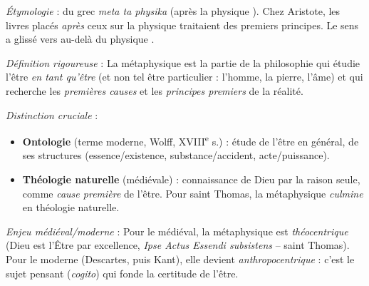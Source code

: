 \documentclass[11pt]{article}
\begin{document}
\begin{definition}
\emph{Étymologie} : du grec \emph{meta ta physika} (\guillemotleft après la physique \guillemotright). Chez Aristote, les livres placés \emph{après} ceux sur la physique traitaient des premiers principes. Le sens a glissé vers \guillemotleft au-delà du physique \guillemotright.
\par
\emph{Définition rigoureuse} : La métaphysique est la partie de la philosophie qui étudie l'être \emph{en tant qu'être} (et non tel être particulier : l'homme, la pierre, l'âme) et qui recherche les \emph{premières causes} et les \emph{principes premiers} de la réalité.
\par
\emph{Distinction cruciale} :
\begin{itemize}
    \item \textbf{Ontologie} (terme moderne, Wolff, XVIII\textsuperscript{e} s.) : étude de l'être en général, de ses structures (essence/existence, substance/accident, acte/puissance).
    \item \textbf{Théologie naturelle} (médiévale) : connaissance de Dieu par la raison seule, comme \emph{cause première} de l'être. Pour saint Thomas, la métaphysique \emph{culmine} en théologie naturelle.
\end{itemize}
\par
\emph{Enjeu médiéval/moderne} : Pour le médiéval, la métaphysique est \emph{théocentrique} (Dieu est l'Être par excellence, \emph{Ipse Actus Essendi subsistens} -- saint Thomas). Pour le moderne (Descartes, puis Kant), elle devient \emph{anthropocentrique} : c'est le sujet pensant (\emph{cogito}) qui fonde la certitude de l'être.
\end{definition}
\end{document}

